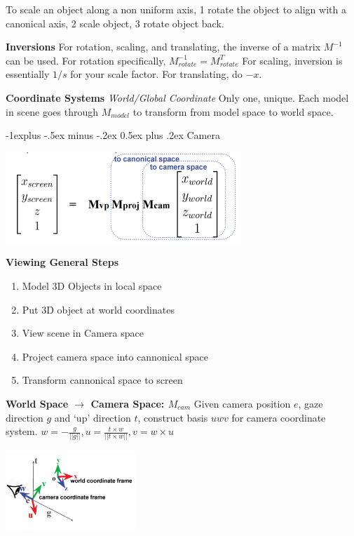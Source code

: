 \documentclass[letterpaper, 8pt]{extarticle}
\makeatletter
\renewcommand{\section}{\@startsection{section}{1}{0mm}%
                                {-1explus -.5ex minus -.2ex}%
                                {0.5ex plus .2ex}%
                                {\normalfont\normalsize\bfseries}}
\makeatother
\begin{document}
\begin{multicols*}{4}
To scale an object along a non uniform axis, 1 rotate the object to align with a canonical axis, 2 scale object, 3 rotate object back.

\textbf{Inversions}
For rotation, scaling, and translating,
the inverse of a matrix \(M^{-1}\) can be used.
For rotation specifically, \(M^{-1}_{rotate}=M^T_{rotate}\)
For scaling, inversion is essentially \(1/s\) for your scale factor.
For translating, do \(-x\).

\textbf{Coordinate Systems}
\textit{World/Global Coordinate}
Only one, unique.
Each model in scene goes through \(M_{model}\) to transform from model space to world space.

\section{Camera}

\includegraphics[width=\linewidth]{cam-total.png}

\textbf{Viewing General Steps}
\begin{enumerate}
    \item Model 3D Objects in local space
    \item Put 3D object at world coordinates
    \item View scene in Camera space
    \item Project camera space into cannonical space
    \item Transform cannonical space to screen
\end{enumerate}

\textbf{World Space $\to$ Camera Space: $M_{cam}$}
Given camera position $e$, gaze direction $g$ and `up' direction $t$, construct basis $uwv$ for camera coordinate system.
$w = - \frac{g}{||g||}, u = \frac{t \times w}{||t \times w||}, v = w \times u$

\includegraphics[height=3cm]{camera-basis.png}


\end{multicols*}
\end{document}
